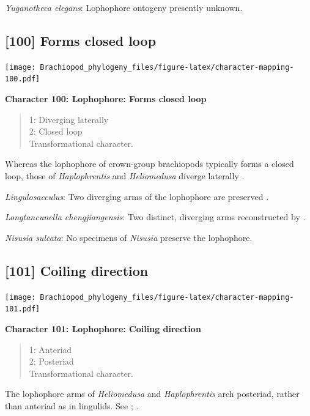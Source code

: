 \documentclass[openany]{book}
\theoremstyle{definition}
\theoremstyle{definition}
\theoremstyle{definition}
\theoremstyle{remark}
\begin{document}
\emph{Yuganotheca elegans}: Lophophore ontogeny presently unknown.

\hypertarget{forms-closed-loop}{%
\subsection*{{[}100{]} Forms closed loop}\label{forms-closed-loop}}

\texttt{[image: Brachiopod\_phylogeny\_files/figure-latex/character-mapping-100.pdf]}

\textbf{Character 100: Lophophore: Forms closed loop}

\begin{quote}
1: Diverging laterally\\
2: Closed loop\\
Transformational character.
\end{quote}

Whereas the lophophore of crown-group brachiopods typically forms a
closed loop, those of \emph{Haplophrentis} and \emph{Heliomedusa}
diverge laterally \citep{Moysiuk2017Hyolithsare}.

\emph{Lingulosacculus}: Two diverging arms of the lophophore are
preserved \citep{Balthasar2009EarlyCambrian}.

\emph{Longtancunella chengjiangensis}: Two distinct, diverging arms
reconstructed by \citet{Zhang2007Agregarious}.

\emph{Nisusia sulcata}: No specimens of \emph{Nisusia} preserve the
lophophore.

\hypertarget{coiling-direction}{%
\subsection*{{[}101{]} Coiling direction}\label{coiling-direction}}

\texttt{[image: Brachiopod\_phylogeny\_files/figure-latex/character-mapping-101.pdf]}

\textbf{Character 101: Lophophore: Coiling direction}

\begin{quote}
1: Anteriad\\
2: Posteriad\\
Transformational character.
\end{quote}

The lophophore arms of \emph{Heliomedusa} and \emph{Haplophrentis} arch
posteriad, rather than anteriad as in lingulids. See
\citet{Zhang2009Architectureand}; \citet{Moysiuk2017Hyolithsare}.
\end{document}

